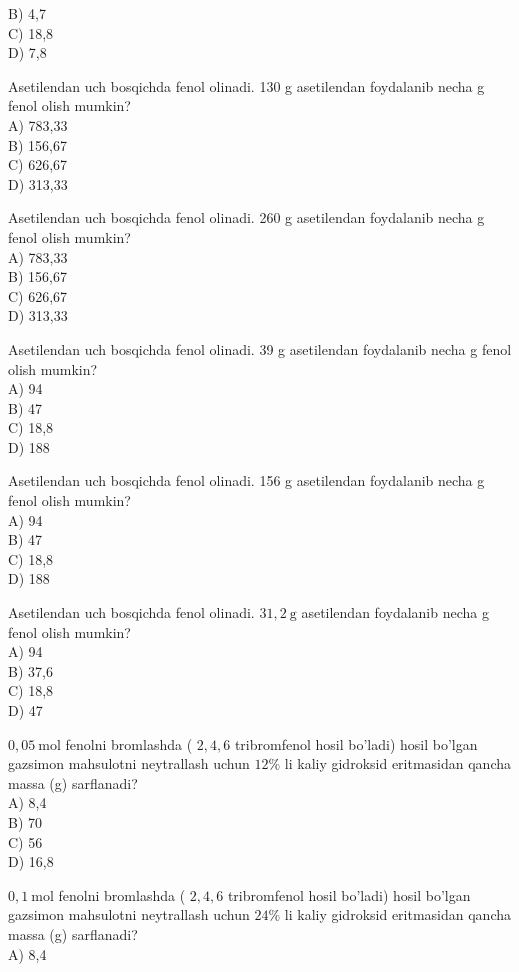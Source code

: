 B) 4,7\\
C) 18,8\\
D) 7,8
  \item Asetilendan uch bosqichda fenol olinadi. 130 g asetilendan foydalanib necha g fenol olish mumkin?\\
A) 783,33\\
B) 156,67\\
C) 626,67\\
D) 313,33
  \item Asetilendan uch bosqichda fenol olinadi. 260 g asetilendan foydalanib necha g fenol olish mumkin?\\
A) 783,33\\
B) 156,67\\
C) 626,67\\
D) 313,33
  \item Asetilendan uch bosqichda fenol olinadi. 39 g asetilendan foydalanib necha g fenol olish mumkin?\\
A) 94\\
B) 47\\
C) 18,8\\
D) 188
  \item Asetilendan uch bosqichda fenol olinadi. 156 g asetilendan foydalanib necha g fenol olish mumkin?\\
A) 94\\
B) 47\\
C) 18,8\\
D) 188
  \item Asetilendan uch bosqichda fenol olinadi. $31,2 \mathrm{~g}$ asetilendan foydalanib necha g fenol olish mumkin?\\
A) 94\\
B) 37,6\\
C) 18,8\\
D) 47
  \item $0,05 \mathrm{~mol}$ fenolni bromlashda ( $2,4,6$ tribromfenol hosil bo'ladi) hosil bo'lgan gazsimon mahsulotni neytrallash uchun $12 \%$ li kaliy gidroksid eritmasidan qancha massa (g) sarflanadi?\\
A) 8,4\\
B) 70\\
C) 56\\
D) 16,8
  \item $0,1 \mathrm{~mol}$ fenolni bromlashda ( $2,4,6$ tribromfenol hosil bo'ladi) hosil bo'lgan gazsimon mahsulotni neytrallash uchun $24 \%$ li kaliy gidroksid eritmasidan qancha massa (g) sarflanadi?\\
A) 8,4\\
